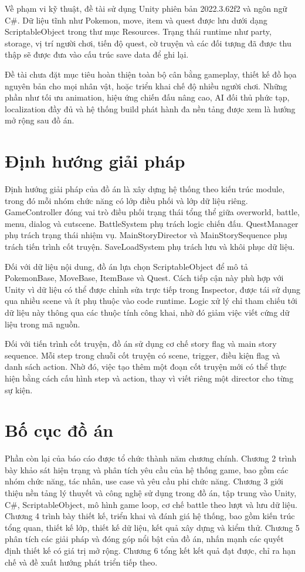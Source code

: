 Về phạm vi kỹ thuật, đề tài sử dụng Unity phiên bản 2022.3.62f2 và ngôn ngữ C\#. Dữ liệu tĩnh như Pokemon, move, item và quest được lưu dưới dạng ScriptableObject trong thư mục Resources. Trạng thái runtime như party, storage, vị trí người chơi, tiến độ quest, cờ truyện và các đối tượng đã được thu thập sẽ được đưa vào cấu trúc save data để ghi lại.

Đề tài chưa đặt mục tiêu hoàn thiện toàn bộ cân bằng gameplay, thiết kế đồ họa nguyên bản cho mọi nhân vật, hoặc triển khai chế độ nhiều người chơi. Những phần như tối ưu animation, hiệu ứng chiến đấu nâng cao, AI đối thủ phức tạp, localization đầy đủ và hệ thống build phát hành đa nền tảng được xem là hướng mở rộng sau đồ án.

\section{Định hướng giải pháp}

Định hướng giải pháp của đồ án là xây dựng hệ thống theo kiến trúc module, trong đó mỗi nhóm chức năng có lớp điều phối và lớp dữ liệu riêng. GameController đóng vai trò điều phối trạng thái tổng thể giữa overworld, battle, menu, dialog và cutscene. BattleSystem phụ trách logic chiến đấu. QuestManager phụ trách trạng thái nhiệm vụ. MainStoryDirector và MainStorySequence phụ trách tiến trình cốt truyện. SaveLoadSystem phụ trách lưu và khôi phục dữ liệu.

Đối với dữ liệu nội dung, đồ án lựa chọn ScriptableObject để mô tả PokemonBase, MoveBase, ItemBase và Quest. Cách tiếp cận này phù hợp với Unity vì dữ liệu có thể được chỉnh sửa trực tiếp trong Inspector, được tái sử dụng qua nhiều scene và ít phụ thuộc vào code runtime. Logic xử lý chỉ tham chiếu tới dữ liệu này thông qua các thuộc tính công khai, nhờ đó giảm việc viết cứng dữ liệu trong mã nguồn.

Đối với tiến trình cốt truyện, đồ án sử dụng cơ chế story flag và main story sequence. Mỗi step trong chuỗi cốt truyện có scene, trigger, điều kiện flag và danh sách action. Nhờ đó, việc tạo thêm một đoạn cốt truyện mới có thể thực hiện bằng cách cấu hình step và action, thay vì viết riêng một director cho từng sự kiện.

\section{Bố cục đồ án}

Phần còn lại của báo cáo được tổ chức thành năm chương chính. Chương 2 trình bày khảo sát hiện trạng và phân tích yêu cầu của hệ thống game, bao gồm các nhóm chức năng, tác nhân, use case và yêu cầu phi chức năng. Chương 3 giới thiệu nền tảng lý thuyết và công nghệ sử dụng trong đồ án, tập trung vào Unity, C\#, ScriptableObject, mô hình game loop, cơ chế battle theo lượt và lưu dữ liệu. Chương 4 trình bày thiết kế, triển khai và đánh giá hệ thống, bao gồm kiến trúc tổng quan, thiết kế lớp, thiết kế dữ liệu, kết quả xây dựng và kiểm thử. Chương 5 phân tích các giải pháp và đóng góp nổi bật của đồ án, nhấn mạnh các quyết định thiết kế có giá trị mở rộng. Chương 6 tổng kết kết quả đạt được, chỉ ra hạn chế và đề xuất hướng phát triển tiếp theo.

